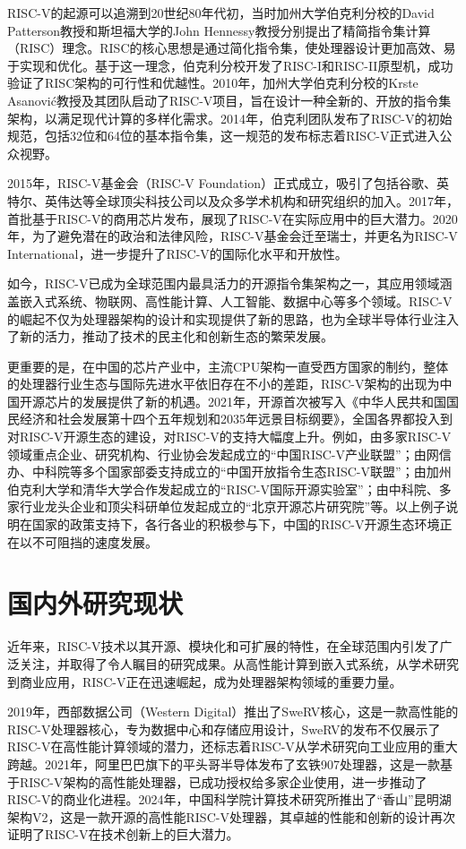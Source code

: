 RISC-V的起源可以追溯到20世纪80年代初，当时加州大学伯克利分校的David Patterson教授和斯坦福大学的John Hennessy教授分别提出了精简指令集计算（RISC）理念\cite{cocke1990evolution}。RISC的核心思想是通过简化指令集，使处理器设计更加高效、易于实现和优化。基于这一理念，伯克利分校开发了RISC-I和RISC-II原型机，成功验证了RISC架构的可行性和优越性。2010年，加州大学伯克利分校的Krste Asanović教授及其团队启动了RISC-V项目，旨在设计一种全新的、开放的指令集架构，以满足现代计算的多样化需求\cite{waterman2011risc}。2014年，伯克利团队发布了RISC-V的初始规范，包括32位和64位的基本指令集\cite{asanovic2014instruction}，这一规范的发布标志着RISC-V正式进入公众视野。

2015年，RISC-V基金会（RISC-V Foundation）正式成立，吸引了包括谷歌、英特尔、英伟达等全球顶尖科技公司以及众多学术机构和研究组织的加入。2017年，首批基于RISC-V的商用芯片发布，展现了RISC-V在实际应用中的巨大潜力。2020年，为了避免潜在的政治和法律风险，RISC-V基金会迁至瑞士，并更名为RISC-V International，进一步提升了RISC-V的国际化水平和开放性。

如今，RISC-V已成为全球范围内最具活力的开源指令集架构之一，其应用领域涵盖嵌入式系统、物联网、高性能计算、人工智能、数据中心等多个领域。RISC-V的崛起不仅为处理器架构的设计和实现提供了新的思路，也为全球半导体行业注入了新的活力，推动了技术的民主化和创新生态的繁荣发展。

更重要的是，在中国的芯片产业中，主流CPU架构一直受西方国家的制约，整体的处理器行业生态与国际先进水平依旧存在不小的差距，RISC-V架构的出现为中国开源芯片的发展提供了新的机遇。2021年，开源首次被写入《中华人民共和国国民经济和社会发展第十四个五年规划和2035年远景目标纲要》\cite{JJRB202112060060}，全国各界都投入到对RISC-V开源生态的建设，对RISC-V的支持大幅度上升。例如，由多家RISC-V领域重点企业、研究机构、行业协会发起成立的``中国RISC-V产业联盟''；由网信办、中科院等多个国家部委支持成立的``中国开放指令生态RISC-V联盟''；由加州伯克利大学和清华大学合作发起成立的``RISC-V国际开源实验室''；由中科院、多家行业龙头企业和顶尖科研单位发起成立的``北京开源芯片研究院''等。以上例子说明在国家的政策支持下，各行各业的积极参与下，中国的RISC-V开源生态环境正在以不可阻挡的速度发展。


\section{国内外研究现状}
近年来，RISC-V技术以其开源、模块化和可扩展的特性，在全球范围内引发了广泛关注，并取得了令人瞩目的研究成果。从高性能计算到嵌入式系统，从学术研究到商业应用，RISC-V正在迅速崛起，成为处理器架构领域的重要力量。

2019年，西部数据公司（Western Digital）推出了SweRV核心，这是一款高性能的RISC-V处理器核心，专为数据中心和存储应用设计，SweRV的发布不仅展示了RISC-V在高性能计算领域的潜力，还标志着RISC-V从学术研究向工业应用的重大跨越\cite{marena2019risc}。2021年，阿里巴巴旗下的平头哥半导体发布了玄铁907处理器，这是一款基于RISC-V架构的高性能处理器，已成功授权给多家企业使用，进一步推动了RISC-V的商业化进程\cite{JCDI202106005}。2024年，中国科学院计算技术研究所推出了``香山''昆明湖架构V2，这是一款开源的高性能RISC-V处理器，其卓越的性能和创新的设计再次证明了RISC-V在技术创新上的巨大潜力\cite{JFYZ202303014}。


